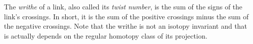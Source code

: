 \documentclass[12pt]{article}
\begin{document}
The \emph{writhe} of a link, also called its \emph{twist number}, is 
the sum of the signs of the link's crossings. In short, it is the sum of the positive crossings minus the sum of the negative crossings. Note that the writhe is not an isotopy invariant and that is actually depends on the regular homotopy class of its projection.
\end{document}

